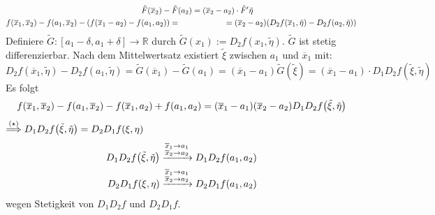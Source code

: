 \begin{gather*}
	\qquad \qquad \tilde F (\overline{x}_2 ) - \tilde F (a_2) = (\overline{x}_2 -a_2 ) \cdot \tilde F'{\tilde \eta} \\
	f(\overline{x}_1 , \overline{x}_2  ) - f(a_1, \overline{x}_2 ) - \enbrace*{ f(\overline{x}_1 - a_2 ) - f(a_1, a_2)} =\qquad \qquad \qquad 
	= (\overline{x}_2 - a_2 ) (D_2 f(\overline{x}_1, \tilde \eta ) - D_2 f(a_2, \tilde \eta))
\end{gather*}
Definiere $\tilde G : [a_1 - \delta , a_1 + \delta ]\to \mathds{R}$ durch $\tilde G(x_1) := D_2 f(x_1, \tilde \eta)$. $\tilde G$ ist stetig differenzierbar. Nach dem 
Mittelwertsatz existiert $\tilde \xi$ zwischen $a_1$ und $\overline{x}_1 $ mit:
\[
	D_2 f(\overline{x}_1 , \tilde \eta ) - D_2 f(a_1, \tilde \eta)= \tilde G (\overline{x}_1 ) - \tilde G(a_1) = (\overline{x}_1 -a_1 )  \tilde G \left( \tilde \xi \right)
	= (\overline{x}_1 - a_1 ) \cdot D_1 D_2 f \left(\tilde \xi, \tilde \eta \right)
\]
Es folgt 
\[
	f(\overline{x}_1, \overline{x}_2  ) - f (a_1, \overline{x}_2 ) - f(\overline{x}_1, a_2 ) + f(a_1, a_2) = (\overline{x}_1 - a_1 ) ( \overline{x}_2 -a_2 ) D_1 D_2 f
	\enbrace*{\tilde \xi , \tilde \eta} 
\]
$\stackrel{(\star)}{\Longrightarrow}   D_1 D_2 f \enbrace*{\tilde \xi, \tilde \eta} = D_2 D_1 f( \xi, \eta) $
\begin{align*}
	D_1 D_2 f \enbrace*{\tilde \xi, \tilde \eta} &\xrightarrow{\substack{\overline{x}_1 \to a_1 \\ \overline{x}_2  \to a_2  }} D_1 D_2 f(a_1, a_2) \\
	D_2 D_1 f( \xi, \eta) &\xrightarrow{\substack{\overline{x}_1 \to a_1 \\ \overline{x}_2  \to a_2  }} D_2 D_1 f(a_1, a_2)
\end{align*}
wegen Stetigkeit von $D_1 D_2 f$ und $D_2 D_1 f$. \bewende 

